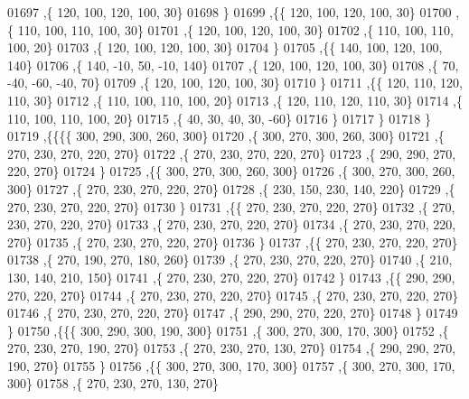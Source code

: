 \begin{DoxyCode}
01697     ,\{   120,   100,   120,   100,    30\}
01698     \}
01699    ,\{\{   120,   100,   120,   100,    30\}
01700     ,\{   110,   100,   110,   100,    30\}
01701     ,\{   120,   100,   120,   100,    30\}
01702     ,\{   110,   100,   110,   100,    20\}
01703     ,\{   120,   100,   120,   100,    30\}
01704     \}
01705    ,\{\{   140,   100,   120,   100,   140\}
01706     ,\{   140,   -10,    50,   -10,   140\}
01707     ,\{   120,   100,   120,   100,    30\}
01708     ,\{    70,   -40,   -60,   -40,    70\}
01709     ,\{   120,   100,   120,   100,    30\}
01710     \}
01711    ,\{\{   120,   110,   120,   110,    30\}
01712     ,\{   110,   100,   110,   100,    20\}
01713     ,\{   120,   110,   120,   110,    30\}
01714     ,\{   110,   100,   110,   100,    20\}
01715     ,\{    40,    30,    40,    30,   -60\}
01716     \}
01717    \}
01718   \}
01719  ,\{\{\{\{   300,   290,   300,   260,   300\}
01720     ,\{   300,   270,   300,   260,   300\}
01721     ,\{   270,   230,   270,   220,   270\}
01722     ,\{   270,   230,   270,   220,   270\}
01723     ,\{   290,   290,   270,   220,   270\}
01724     \}
01725    ,\{\{   300,   270,   300,   260,   300\}
01726     ,\{   300,   270,   300,   260,   300\}
01727     ,\{   270,   230,   270,   220,   270\}
01728     ,\{   230,   150,   230,   140,   220\}
01729     ,\{   270,   230,   270,   220,   270\}
01730     \}
01731    ,\{\{   270,   230,   270,   220,   270\}
01732     ,\{   270,   230,   270,   220,   270\}
01733     ,\{   270,   230,   270,   220,   270\}
01734     ,\{   270,   230,   270,   220,   270\}
01735     ,\{   270,   230,   270,   220,   270\}
01736     \}
01737    ,\{\{   270,   230,   270,   220,   270\}
01738     ,\{   270,   190,   270,   180,   260\}
01739     ,\{   270,   230,   270,   220,   270\}
01740     ,\{   210,   130,   140,   210,   150\}
01741     ,\{   270,   230,   270,   220,   270\}
01742     \}
01743    ,\{\{   290,   290,   270,   220,   270\}
01744     ,\{   270,   230,   270,   220,   270\}
01745     ,\{   270,   230,   270,   220,   270\}
01746     ,\{   270,   230,   270,   220,   270\}
01747     ,\{   290,   290,   270,   220,   270\}
01748     \}
01749    \}
01750   ,\{\{\{   300,   290,   300,   190,   300\}
01751     ,\{   300,   270,   300,   170,   300\}
01752     ,\{   270,   230,   270,   190,   270\}
01753     ,\{   270,   230,   270,   130,   270\}
01754     ,\{   290,   290,   270,   190,   270\}
01755     \}
01756    ,\{\{   300,   270,   300,   170,   300\}
01757     ,\{   300,   270,   300,   170,   300\}
01758     ,\{   270,   230,   270,   130,   270\}

\end{DoxyCode}
